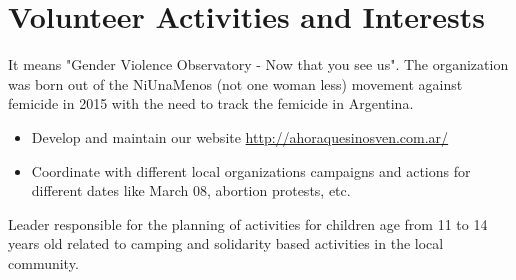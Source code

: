 \documentclass[11pt,a4paper,sans]{moderncv}
\begin{document}
\section{Volunteer Activities and Interests}
It means "Gender Violence Observatory - Now that you see us". The organization was born out of the NiUnaMenos (not one woman less) movement against femicide in 2015 with the need to track the femicide in Argentina.

\begin{itemize}
  \item Develop and maintain our website {\url{http://ahoraquesinosven.com.ar/}}
  \item Coordinate with different local organizations campaigns and actions for different dates like March 08, abortion protests, etc.
\newline
\end{itemize}

Leader responsible for the planning of activities for children age from 11 to 14 years old related to camping and solidarity based activities in the local community.


\clearpage
\end{document}
